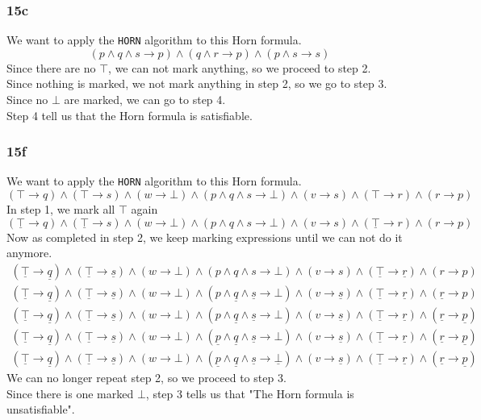 \documentclass[12pt]{article}
\begin{document}
\subsubsection*{15c}
We want to apply the \texttt{HORN} algorithm to this Horn formula.
$$(p\land q\land s\to p)\land(q\land r\to p)\land(p\land s\to s)$$
Since there are no $\top$, we can not mark anything, so we proceed to step 2.\\
Since nothing is marked, we not mark anything in step 2, so we go to step 3.\\
Since no $\bot$ are marked, we can go to step 4.\\
Step 4 tell us that the Horn formula is satisfiable.

\subsubsection*{15f}
We want to apply the \texttt{HORN} algorithm to this Horn formula.
$$(\top\to q)\land(\top\to s)\land(w\to\bot)\land(p\land q\land s\to\bot)\land(v\to s)\land(\top\to r)\land(r\to p)$$
In step 1, we mark all $\top$ again
$$(\underline{\top}\to q)\land(\underline{\top}\to s)\land(w\to\bot)\land(p\land q\land s\to\bot)\land(v\to s)\land(\underline{\top}\to r)\land(r\to p)$$
Now as completed in step 2, we keep marking expressions until we can not do it anymore.
\begin{align*}
(\underline{\top}\to \underline{q})\land(\underline{\top}\to \underline{s})\land(w\to\bot)\land(p\land q\land s\to\bot)\land(v\to s)\land(\underline{\top}\to \underline{r})\land(r\to p) \\
(\underline{\top}\to \underline{q})\land(\underline{\top}\to \underline{s})\land(w\to\bot)\land(p\land \underline{q}\land \underline{s}\to\bot)\land(v\to \underline{s})\land(\underline{\top}\to \underline{r})\land(\underline{r}\to p) \\
(\underline{\top}\to \underline{q})\land(\underline{\top}\to \underline{s})\land(w\to\bot)\land(p\land \underline{q}\land \underline{s}\to\bot)\land(v\to \underline{s})\land(\underline{\top}\to \underline{r})\land(\underline{r}\to \underline{p}) \\
(\underline{\top}\to \underline{q})\land(\underline{\top}\to \underline{s})\land(w\to\bot)\land(\underline{p}\land \underline{q}\land \underline{s}\to\bot)\land(v\to \underline{s})\land(\underline{\top}\to \underline{r})\land(\underline{r}\to \underline{p}) \\
(\underline{\top}\to \underline{q})\land(\underline{\top}\to \underline{s})\land(w\to\bot)\land(\underline{p}\land \underline{q}\land \underline{s}\to\underline{\bot})\land(v\to \underline{s})\land(\underline{\top}\to \underline{r})\land(\underline{r}\to \underline{p})
\end{align*}
We can no longer repeat step 2, so we proceed to step 3.\\
Since there is one marked $\bot$, step 3 tells us that "The Horn formula is unsatisfiable".
\end{document}
